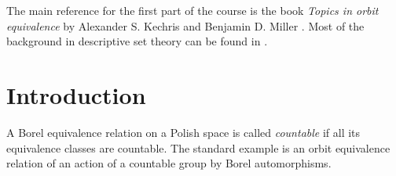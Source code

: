 \documentclass[10pt]{amsart}
\theoremstyle{definition}
\theoremstyle{remark}
\begin{document}
The main reference for the first part of the course is the book \emph{Topics in orbit equivalence} by Alexander S. Kechris and Benjamin D. Miller \cite{MR2095154}. 
Most of the background in descriptive set theory can be found in \cite{MR2455198, MR1321597}. 


%
%
%







\section{Introduction} 

A Borel equivalence relation on a Polish space is called \emph{countable} if all its equivalence classes are countable. 
The standard example is an orbit equivalence relation of an action of a countable group by Borel automorphisms. 
\end{document}
